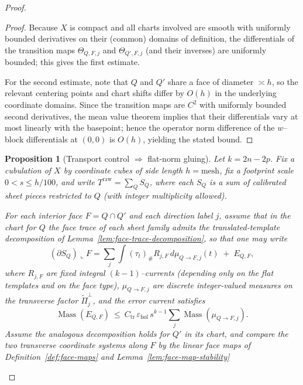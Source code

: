 \documentclass[11pt]{article}
\numberwithin{equation}{section}  %
\theoremstyle{plain}
\newtheorem{proposition}[theorem]{Proposition}
\theoremstyle{definition}
\theoremstyle{remark}
\DeclareMathOperator{\Mass}{Mass}
\begin{document}
\begin{proof}
\begin{proof}
Because $X$ is compact and all charts involved are smooth with uniformly bounded derivatives on their
(common) domains of definition, the differentials of the transition maps
$\Theta_{Q,F,j}$ and $\Theta_{Q',F,j}$ (and their inverses) are uniformly bounded; this gives the
first estimate.

For the second estimate, note that $Q$ and $Q'$ share a face of diameter $\asymp h$, so the relevant
centering points and chart shifts differ by $O(h)$ in the underlying coordinate domains.
Since the transition maps are $C^2$ with uniformly bounded second derivatives, the mean value theorem
implies that their differentials vary at most linearly with the basepoint; hence the operator norm
difference of the $w$--block differentials at $(0,0)$ is $O(h)$, yielding the stated bound.
\end{proof}


\begin{proposition}[Transport control $\Rightarrow$ flat-norm gluing]\label{prop:transport-flat-glue}\label{prop:transport-cell}
Let $k=2n-2p$.  Fix a cubulation of $X$ by coordinate cubes of side length $h=\mathrm{mesh}$, fix a footprint scale
$0<s\le h/100$, and write $T^{\mathrm{raw}}=\sum_Q S_Q$, where each $S_Q$ is a sum of calibrated sheet pieces
restricted to $Q$ (with integer multiplicity allowed).

For each interior face $F=Q\cap Q'$ and each direction label $j$, assume that in the chart for $Q$ the face trace
of each sheet family admits the translated-template decomposition of Lemma~\ref{lem:face-trace-decomposition},
so that one may write
\[
(\partial S_Q)\llcorner F
=\sum_{j}\int (\tau_t)_\# R_{j,F}\, d\mu_{Q\to F,j}(t)\;+\;E_{Q,F},
\]
where $R_{j,F}$ are fixed integral $(k\!-\!1)$--currents (depending only on the flat templates and on the face type),
$\mu_{Q\to F,j}$ are discrete integer-valued measures on the transverse factor $\widetilde\Pi_j^\perp$, and the error
current satisfies
\[
\Mass(E_{Q,F})\ \le\ C_{\mathrm{tr}}\,\varepsilon_{\mathrm{hol}}\,s^{k-1}\sum_j \Mass(\mu_{Q\to F,j}).
\]
Assume the analogous decomposition holds for $Q'$ in its chart, and compare the two transverse coordinate systems
along $F$ by the linear face maps of Definition~\ref{def:face-maps} and Lemma~\ref{lem:face-map-stability}


\end{proposition}
\end{proof}
\end{document}
